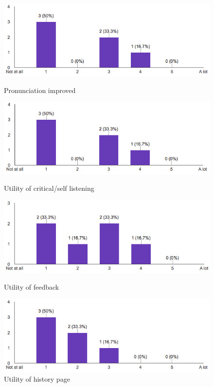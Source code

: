 \begin{figure}[!ht]
	\centering
	\begin{minipage}{.5\textwidth}
		\centering
		\includegraphics[scale=0.4]{Figures/responses/application_improved_pronunciation.png}
		\caption{Pronunciation improved}
		\label{fig:application_improved_pronunciation}
	\end{minipage}%
	\begin{minipage}{.5\textwidth}
		\centering
		\includegraphics[scale=0.4]{Figures/responses/utility_of_listening.png}
		\caption{Utility of critical/self listening}
		\label{fig:utility_listening}
	\end{minipage}
	\begin{minipage}{.5\textwidth}
		\centering
		\includegraphics[scale=0.4]{Figures/responses/application_rate_feedback.png}
		\caption{Utility of feedback}
		\label{fig:application_rate_feedback}
	\end{minipage}%
	\begin{minipage}{.5\textwidth}
		\centering
		\includegraphics[scale=0.4]{Figures/responses/utility_of_history.png}
		\caption{Utility of history page}
		\label{fig:utility_history}
	\end{minipage}%
\end{figure}
